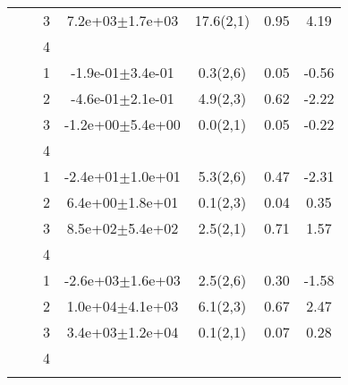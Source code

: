 \begin{longtable}{llccccS[table-format=-2.2, table-space-text-post = {***}]}
   &  & 3 &  7.2e+03$\pm$1.7e+03 & 17.6(2,1) & 0.95 & 4.19 \\ 
   &  & 4 &  &  &  &  \\ 
   \midrule
{} & {} & 1 & -1.9e-01$\pm$3.4e-01 & 0.3(2,6) & 0.05 & -0.56 \\ 
   &  & 2 & -4.6e-01$\pm$2.1e-01 & 4.9(2,3) & 0.62 & -2.22 \\ 
   &  & 3 & -1.2e+00$\pm$5.4e+00 & 0.0(2,1) & 0.05 & -0.22 \\ 
   &  & 4 &  &  &  &  \\ 
   \midrule
{} & {} & 1 & -2.4e+01$\pm$1.0e+01 & 5.3(2,6) & 0.47 & -2.31 \\ 
   &  & 2 &  6.4e+00$\pm$1.8e+01 & 0.1(2,3) & 0.04 & 0.35 \\ 
   &  & 3 &  8.5e+02$\pm$5.4e+02 & 2.5(2,1) & 0.71 & 1.57 \\ 
   &  & 4 &  &  &  &  \\ 
   \midrule
{} & {} & 1 & -2.6e+03$\pm$1.6e+03 & 2.5(2,6) & 0.30 & -1.58 \\ 
   &  & 2 &  1.0e+04$\pm$4.1e+03 & 6.1(2,3) & 0.67 & 2.47 \\ 
   &  & 3 &  3.4e+03$\pm$1.2e+04 & 0.1(2,1) & 0.07 & 0.28 \\ 
   &  & 4 &  &  &  &  \\ 
   \bottomrule
\label{bivar_lm_summ_veg_type}
\end{longtable}

